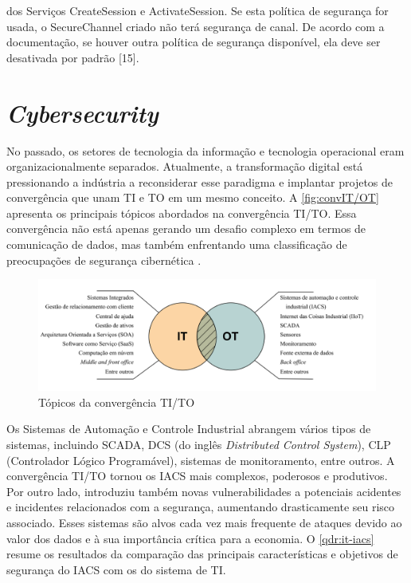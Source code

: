 dos Serviços CreateSession e ActivateSession. Se esta política de segurança for usada, o SecureChannel criado não terá segurança de canal. De acordo com a documentação, se houver outra política de segurança disponível, ela deve ser desativada por padrão [15].
        
    \section{\textit{Cybersecurity}} \label{sec:cybersecurity}

    No passado, os setores de tecnologia da informação e tecnologia operacional eram organizacionalmente separados. Atualmente, a transformação digital está pressionando a indústria a reconsiderar esse paradigma e implantar projetos de convergência que unam TI e TO em um mesmo conceito. A \autoref{fig:convIT/OT} apresenta os principais tópicos abordados na convergência TI/TO. Essa convergência não está apenas gerando um desafio complexo em termos de comunicação de dados, mas também enfrentando uma classificação de preocupações de segurança cibernética \cite{wiboonrat2022}.

    \begin{figure}[htbp]
        \caption{\label{fig:convIT/OT}Tópicos da convergência TI/TO}
        \begin{center}
            \includegraphics[width=1\textwidth]{USPSC-img/convergenceITOT.png}
        \end{center}
    \end{figure}

    Os Sistemas de Automação e Controle Industrial abrangem vários tipos de sistemas, incluindo SCADA, DCS (do inglês \textit{Distributed Control System}), CLP (Controlador Lógico Programável), sistemas de monitoramento, entre outros. A convergência TI/TO tornou os IACS mais complexos, poderosos e produtivos. Por outro lado, introduziu também novas vulnerabilidades a potenciais acidentes e incidentes relacionados com a segurança, aumentando drasticamente seu risco associado. Esses sistemas são alvos cada vez mais frequente de ataques devido ao valor dos dados e à sua importância crítica para a economia. O \autoref{qdr:it-iacs} resume os resultados da comparação das principais características e objetivos de segurança do IACS com os do sistema de TI.
    
